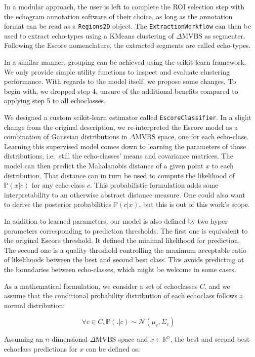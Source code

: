 \documentclass[
  10pt,
  letterpaper,
]{article}
\begin{document}
In a modular approach, the user is left to complete the ROI selection
step with the echogram annotation software of their choice, as long as
the annotation format can be read as a \texttt{Regions2D} object. The
\texttt{ExtractionWorkflow} can then be used to extract echo-types using
a KMeans clustering of \(\Delta \text{MVBS}\) as segmenter. Following
the Escore nomenclature, the extracted segments are called echo-types.

In a similar manner, grouping can be achieved using the scikit-learn
framework. We only provide simple utility functions to inspect and
evaluate clustering performance. With regards to the model itself, we
propose some changes. To begin with, we dropped step 4, unsure of the
additional benefits compared to applying step 5 to all echoclasses.

We designed a custom scikit-learn estimator called
\texttt{EscoreClassifier}. In a slight change from the original
description, we re-interpreted the Escore model as a combination of
Gaussian distributions in \(\Delta \text{MVBS}\) space, one for each
echo-class. Learning this supervised model comes down to learning the
parameters of those distributions, i.e.~still the echo-classes' means
and covariance matrices. The model can then predict the Mahalanobis
distance of a given point \(x\) to each distribution. That distance can
in turn be used to compute the likelihood of \(\mathbb{P}(x|c)\) for any
echo-class \(c\). This probabilistic formulation adds some
interpretability to an otherwise abstract distance measure. One could
also want to derive the posterior probabilities \(\mathbb{P}(c|x)\), but
this is out of this work's scope.

In addition to learned parameters, our model is also defined by two
hyper parameters corresponding to prediction thresholds. The first one
is equivalent to the original Escore threshold. It defined the minimal
likelihood for prediction. The second one is a quality threshold
controlling the maximum acceptable ratio of likelihoods between the best
and second best class. This avoids predicting at the boundaries between
echo-classes, which might be welcome in some cases.

As a mathematical formulation, we consider a set of echoclasses \(C\),
and we assume that the conditional probability distribution of each
echoclass follows a normal distribution:

\[
\forall c \in C, \mathbb{P}(.|c) \sim \mathcal{N}(\mu_c, \Sigma_c)
\]

Assuming an \(n\)-dimensional \(\Delta \text{MVBS}\) space and
\(x \in \mathbb{R}^n\), the best and second best echoclass predictions
for \(x\) can be defined as:
\end{document}
